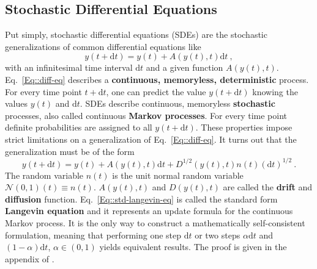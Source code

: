 	\subsection{Stochastic Differential Equations}
	Put simply, stochastic differential equations (SDEs) are the stochastic generalizations of common differential equations like
	\begin{equation} \label{Eq::diff-eq}
		y(t + \text{d}t) =	y(t) + A(y(t), t) \mathrm{d}t ~,
	\end{equation}
	with an  infinitesimal time interval $\text{d}t$ and a given function $A(y(t), t)$. Eq.~\eqref{Eq::diff-eq} describes a \textbf{continuous, memoryless, deterministic} process. For every time point $t + \text{d}t$, one can predict the value $y(t+\text{d}t)$ knowing the values $y(t)$ and $\text{d}t$. SDEs describe continuous, memoryless \textbf{stochastic} processes, also called continuous \textbf{Markov processes}. For every time point definite probabilities are assigned to all $y(t + \text{d}t)$. These properties impose strict limitations on a generalization of Eq.~\eqref{Eq::diff-eq}. It turns out that the generalization must be of the form
	\begin{equation} \label{Eq::std-langevin-eq}
		y(t + \text{d}t) =	y(t) + A(y(t), t) \text{d}t + D^{1/2} \left(y(t), t\right) n(t) (\text{d}t)^{1/2}~.
	\end{equation}
	The random variable $n(t)$ is the unit normal random variable  $\mathcal{N}(0,1)(t) \equiv n(t)$. $A(y(t), t)$ and $D(y(t), t)$ are called the \textbf{drift} and \textbf{diffusion} function. Eq.~\eqref{Eq::std-langevin-eq} is called the standard form \textbf{Langevin equation} and it represents an update formula for the continuous Markov process. It is the only way to construct a mathematically self-consistent formulation, meaning that performing one step $\text{d}t$ or two steps $\alpha \text{d}t$ and $(1 - \alpha)\text{d}t$, $\alpha \in (0, 1)$ yields equivalent results. The proof is given in the appendix of \cite{gillespie1996mathematics}. \\
	

